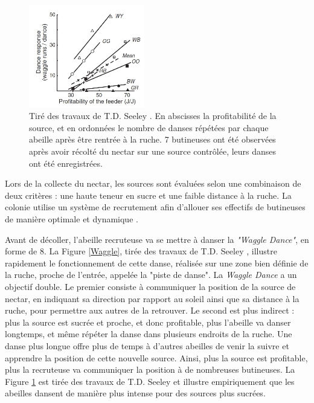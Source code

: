 			
	\begin{figure}
	\centering
	\includegraphics[width=0.45\textwidth]{Pictures/Graphs/SeeleyWaggles.JPG}
	\caption[Tiré des travaux de T.D. Seeley \cite{seeley_wisdom_1995}. En abscisses la profitabilité de la source, et en ordonnées le nombre de 8 (de \textit{Waggle}) réalisés par chaque abeille par danse après être rentrée à la ruche.]{Tiré des travaux de T.D. Seeley \cite{seeley_wisdom_1995}. En abscisses la profitabilité de la source, et en ordonnées le nombre de danses répétées par chaque abeille après être rentrée à la ruche. 7 butineuses ont été observées après avoir récolté du nectar sur une source contrôlée, leurs danses ont été enregistrées.}
	\label{SeeleyWaggles}
	\end{figure}
	
			
			
			Lors de la collecte du nectar, les sources sont évaluées selon une combinaison de deux critères : une haute teneur en sucre et une faible distance à la ruche. La colonie utilise un système de recrutement afin d'allouer ses effectifs de butineuses de manière optimale et dynamique \cite{riviere_modemulti-agent_2021}.
	
	Avant de décoller, l'abeille recruteuse va se mettre à danser la \textit{"Waggle Dance"}, en forme de 8. La Figure \ref{Waggle}, tirée des travaux de T.D. Seeley \cite{seeley_wisdom_1995}, illustre rapidement le fonctionnement de cette danse, réalisée sur une zone bien définie de la ruche, proche de l'entrée, appelée la "piste de danse". La \textit{Waggle Dance} a un objectif double. Le premier consiste à communiquer la position de la source de nectar, en indiquant sa direction par rapport au soleil ainsi que sa distance à la ruche, pour permettre aux autres de la retrouver. Le second est plus indirect : plus la source est sucrée et proche, et donc profitable, plus l'abeille va danser longtemps, et même répéter la danse dans plusieurs endroits de la ruche. Une danse plus longue offre plus de temps à d'autres abeilles de venir la suivre et apprendre la position de cette nouvelle source. Ainsi, plus la source est profitable, plus la recruteuse va communiquer la position à de nombreuses butineuses. La Figure \ref{SeeleyWaggles} est tirée des travaux de T.D. Seeley \cite{seeley_wisdom_1995} et illustre empiriquement que les abeilles dansent de manière plus intense pour des sources plus sucrées.
			
